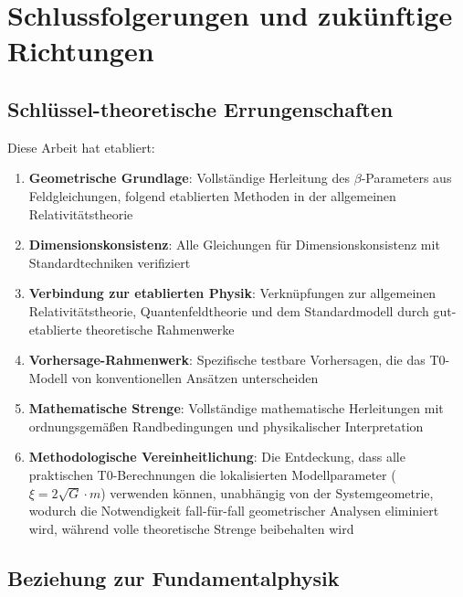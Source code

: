 \documentclass[12pt,a4paper]{article}
\begin{document}
	\section{Schlussfolgerungen und zukünftige Richtungen}
	\label{sec:conclusions}
	
	\subsection{Schlüssel-theoretische Errungenschaften}
	\label{subsec:key_achievements}
	
	Diese Arbeit hat etabliert:
	\begin{enumerate}
		\item \textbf{Geometrische Grundlage}: Vollständige Herleitung des $\beta$-Parameters aus Feldgleichungen, folgend etablierten Methoden in der allgemeinen Relativitätstheorie \citep{misner1973,carroll2004}
		
		\item \textbf{Dimensionskonsistenz}: Alle Gleichungen für Dimensionskonsistenz mit Standardtechniken verifiziert \citep{barenblatt1996}
		
		\item \textbf{Verbindung zur etablierten Physik}: Verknüpfungen zur allgemeinen Relativitätstheorie, Quantenfeldtheorie und dem Standardmodell durch gut-etablierte theoretische Rahmenwerke
		
		\item \textbf{Vorhersage-Rahmenwerk}: Spezifische testbare Vorhersagen, die das T0-Modell von konventionellen Ansätzen unterscheiden
		
		\item \textbf{Mathematische Strenge}: Vollständige mathematische Herleitungen mit ordnungsgemäßen Randbedingungen und physikalischer Interpretation
		
		\item \textbf{Methodologische Vereinheitlichung}: Die Entdeckung, dass alle praktischen T0-Berechnungen die lokalisierten Modellparameter ($\xi = 2\sqrt{G} \cdot m$) verwenden können, unabhängig von der Systemgeometrie, wodurch die Notwendigkeit fall-für-fall geometrischer Analysen eliminiert wird, während volle theoretische Strenge beibehalten wird
	\end{enumerate}
	
	\subsection{Beziehung zur Fundamentalphysik}
	\label{subsec:fundamental_physics}
	
\end{document}
